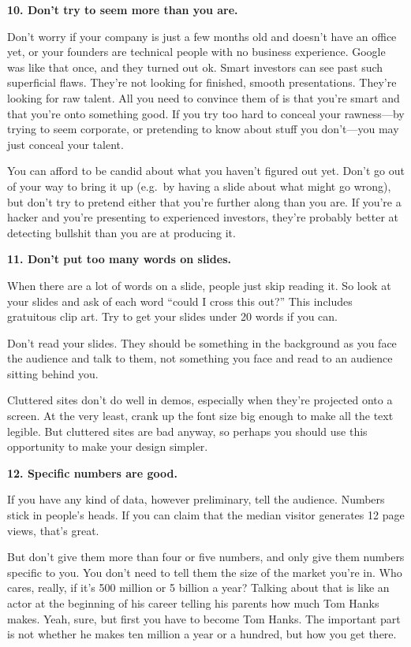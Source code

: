 \textbf{10. Don't try to seem more than you are.}

Don't worry if your company is just a few months old and doesn't have an
office yet, or your founders are technical people with no business
experience. Google was like that once, and they turned out ok. Smart
investors can see past such superficial flaws. They're not looking for
finished, smooth presentations. They're looking for raw talent. All you
need to convince them of is that you're smart and that you're onto
something good. If you try too hard to conceal your rawness---by trying
to seem corporate, or pretending to know about stuff you don't---you may
just conceal your talent.

You can afford to be candid about what you haven't figured out yet.
Don't go out of your way to bring it up (e.g.~by having a slide about
what might go wrong), but don't try to pretend either that you're
further along than you are. If you're a hacker and you're presenting to
experienced investors, they're probably better at detecting bullshit
than you are at producing it.

\textbf{11. Don't put too many words on slides.}

When there are a lot of words on a slide, people just skip reading it.
So look at your slides and ask of each word ``could I cross this out?''
This includes gratuitous clip art. Try to get your slides under 20 words
if you can.

Don't read your slides. They should be something in the background as
you face the audience and talk to them, not something you face and read
to an audience sitting behind you.

Cluttered sites don't do well in demos, especially when they're
projected onto a screen. At the very least, crank up the font size big
enough to make all the text legible. But cluttered sites are bad anyway,
so perhaps you should use this opportunity to make your design simpler.

\textbf{12. Specific numbers are good.}

If you have any kind of data, however preliminary, tell the audience.
Numbers stick in people's heads. If you can claim that the median
visitor generates 12 page views, that's great.

But don't give them more than four or five numbers, and only give them
numbers specific to you. You don't need to tell them the size of the
market you're in. Who cares, really, if it's 500 million or 5 billion a
year? Talking about that is like an actor at the beginning of his career
telling his parents how much Tom Hanks makes. Yeah, sure, but first you
have to become Tom Hanks. The important part is not whether he makes ten
million a year or a hundred, but how you get there.

